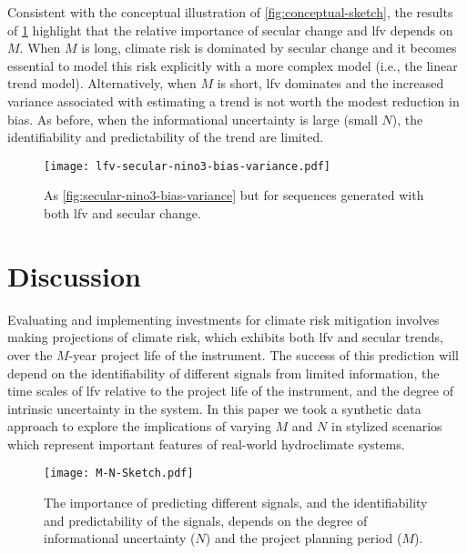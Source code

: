\documentclass[
  draft,
  linenumbers
]{agujournal2018}
\makeatletter
\newcommand{\ie}{i.e.\@\xspace}
\makeatother
\begin{document}
Consistent with the conceptual illustration of \cref{fig:conceptual-sketch}, the results of \cref{fig:lfv-secular-nino3-bias-variance} highlight that the relative importance of secular change and \gls{lfv} depends on $M$.
When $M$ is long, climate risk is dominated by secular change and it becomes essential to model this risk explicitly with a more complex model (\ie, the linear trend model).
Alternatively, when $M$ is short, \gls{lfv} dominates and the increased variance associated with estimating a trend is not worth the modest reduction in bias.
As before, when the informational uncertainty is large (small $N$), the identifiability and predictability of the trend are  limited.
\begin{figure}
  \centering
  \texttt{[image: lfv-secular-nino3-bias-variance.pdf]}
  \caption{
    As \cref{fig:secular-nino3-bias-variance} but for sequences generated with both \gls{lfv} and secular change.
  }\label{fig:lfv-secular-nino3-bias-variance}
\end{figure}


\clearpage
\section{Discussion}\label{sec:discussion-conclusions}

Evaluating and implementing investments for climate risk mitigation involves making projections of climate risk, which exhibits both \gls{lfv} and secular trends, over the $M$-year project life of the instrument.
The success of this prediction will depend on the identifiability of different signals from limited information, the time scales of \gls{lfv} relative to the project life of the instrument, and the degree of intrinsic uncertainty in the system.
In this paper we took a synthetic data approach to explore the implications of varying $M$ and $N$ in stylized scenarios which represent important features of real-world hydroclimate systems.

\begin{figure}
  \centering
  \texttt{[image: M-N-Sketch.pdf]}
  \caption{
    The importance of predicting different signals, and the identifiability and predictability of the signals, depends on the degree of informational uncertainty ($N$) and the project planning period ($M$).
  }\label{fig:m-n-sketch}
\end{figure}
\end{document}
